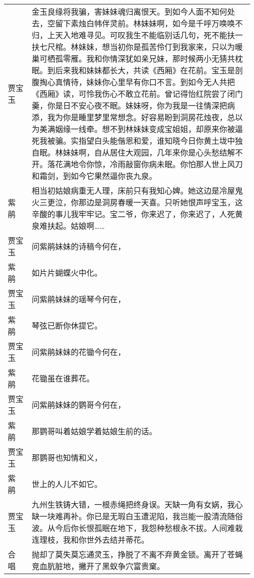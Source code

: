 \documentclass{article}
\newenvironment{lpar}{\vspace{-1ex}\begin{longtable}{lp{0.85\columnwidth}}}{\end{longtable}}
\newcommand\lver[2]{\vspace{1ex}#1&#2\\}
\begin{document}
\begin{lpar}
\lver{贾宝玉}{金玉良缘将我骗，害妹妹魂归离恨天。到如今人面不知何处去，空留下素烛白帏伴灵前。林妹妹啊，如今是千呼万唤唤不归，上天入地难寻见。可叹我生不能临别话几句，死不能扶一扶七尺棺。林妹妹，想当初你是孤苦伶仃到我家来，只以为暖巢可栖孤零雁。我和你情深犹如亲兄妹，那时候两小无猜共枕眠。到后来我和妹妹都长大，共读《西厢》在花前。宝玉是剖腹掏心真情待，妹妹你心里早有你口不言。到如今无人共把《西厢》读，可怜我伤心不敢立花前。曾记得怡红院尝了闭门羹，你是日不安心夜不眠。妹妹呀，你为我是一往情深把病添，我为你是睡里梦里常想念。好容易盼到洞房花烛夜，总以为美满姻缘一线牵。想不到林妹妹变成宝姐姐，却原来你被逼死我被骗。实指望白头能偕恩和爱，谁知晓今日你黄土垅中独自眠。林妹妹啊，自从居住大观园，几年来你是心头愁结解不开。落花满地令你惊，冷雨敲窗你病未眠。你怕那人世上风刀和霜剑，到如今它果然逼你丧九泉。}
\lver{紫　鹃}{相当初姑娘病重无人理，床前只有我知心婢。她这边是冷屋鬼火三更泣，你那边是洞房春暖一天喜。只听她恨声呼宝玉，这辛酸的事儿我牢牢记。宝二爷，你来迟了，你来迟了，人死黄泉难扶起。姑娘啊……}
\lver{贾宝玉}{问紫鹃妹妹的诗稿今何在，}
\lver{紫　鹃}{如片片蝴蝶火中化。}
\lver{贾宝玉}{问紫鹃妹妹的瑶琴今何在，}
\lver{紫　鹃}{琴弦已断你休提它。}
\lver{贾宝玉}{问紫鹃妹妹的花锄今何在，}
\lver{紫　鹃}{花锄虽在谁葬花。}
\lver{贾宝玉}{问紫鹃妹妹的鹦哥今何在，}
\lver{紫　鹃}{那鹦哥叫着姑娘学着姑娘生前的话。}
\lver{贾宝玉}{那鹦哥也知情和义，}
\lver{紫　鹃}{世上的人儿不如它。}
\lver{贾宝玉}{九州生铁铸大错，一根赤绳把终身误。天缺一角有女娲，我心缺一块难再补。你已是无瑕白玉遭泥陷，我岂能一股清流随俗波。从今后你长恨孤眠在地下，我怨种愁根永不拔。人间难栽连理枝，我和你世外去结并蒂花。}
\lver{合　唱}{抛却了莫失莫忘通灵玉，挣脱了不离不弃黄金锁。离开了苍蝇竞血肮脏地，撇开了黑蚁争穴富贵窠。}
\end{lpar}
\end{document}
